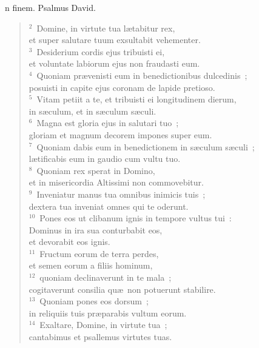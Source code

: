 \bchapter
{}n finem. Psalmus David.
\begin{flushleft}\begin{verse}\vspace{6pt}${}^{2}$~Domine, in virtute tua l\ae tabitur rex,\\ et super salutare tuum exsultabit vehementer.\\
${}^{3}$~Desiderium cordis ejus tribuisti ei,\\ et voluntate labiorum ejus non fraudasti eum.\\
${}^{4}$~Quoniam pr\ae venisti eum in benedictionibus dulcedinis~;\\ posuisti in capite ejus coronam de lapide pretioso.\\
${}^{5}$~Vitam petiit a te, et tribuisti ei longitudinem dierum,\\ in s\ae culum, et in s\ae culum s\ae culi.\\
${}^{6}$~Magna est gloria ejus in salutari tuo~;\\ gloriam et magnum decorem impones super eum.\\
${}^{7}$~Quoniam dabis eum in benedictionem in s\ae culum s\ae culi~;\\ l\ae tificabis eum in gaudio cum vultu tuo.\\
${}^{8}$~Quoniam rex sperat in Domino,\\ et in misericordia Altissimi non commovebitur.\\
${}^{9}$~Inveniatur manus tua omnibus inimicis tuis~;\\ dextera tua inveniat omnes qui te oderunt.\\
${}^{10}$~Pones eos ut clibanum ignis in tempore vultus tui~:\\ Dominus in ira sua conturbabit eos,\\ et devorabit eos ignis.\\
${}^{11}$~Fructum eorum de terra perdes,\\ et semen eorum a filiis hominum,\\
${}^{12}$~quoniam declinaverunt in te mala~;\\ cogitaverunt consilia qu\ae\ non potuerunt stabilire.\\
${}^{13}$~Quoniam pones eos dorsum~;\\ in reliquiis tuis pr\ae parabis vultum eorum.\\
${}^{14}$~Exaltare, Domine, in virtute tua~;\\ cantabimus et psallemus virtutes tuas.\end{verse}\end{flushleft}



